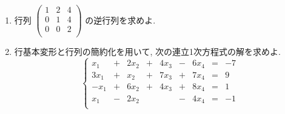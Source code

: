 \documentclass[dvipdfmx,a4paper,11pt]{article}
\theoremstyle{definition}
\begin{document}
\begin{enumerate}[label={\Large \textbf{第}\arabic*\textbf{問}.}]
\item 
行列
$ \begin{pmatrix}
1&2&4\\
0&1&4\\
0&0&2 \\
\end{pmatrix}
 $
の逆行列を求めよ. 


\item 行基本変形と行列の簡約化を用いて, 次の連立1次方程式の解を求めよ.
 $$
 \left\{ 
\begin{matrix}
 x_1& +&2x_2 &  +&4x_3& - &6x_4 &= & -7\\
3x_1&+&x_2& +&7x_3&+&7x_4&= & 9\\
-x_1&+ &6x_2& + &4x_3&+&8x_4&=&1 \\
 x_1&- &2x_2&   & &-&4x_4&=&-1 \\
\end{matrix}
\right.
 $$
 

 
 

\end{enumerate}
\end{document}
